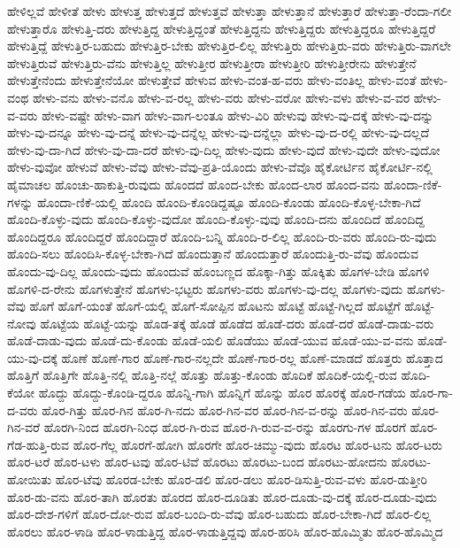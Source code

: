 {ಹೇಳಿಲ್ಲವೆ
ಹೇಳೀತೆ
ಹೇಳು
ಹೇಳುತ್ತ
ಹೇಳುತ್ತದೆ
ಹೇಳುತ್ತವೆ
ಹೇಳುತ್ತಾ
ಹೇಳುತ್ತಾನೆ
ಹೇಳುತ್ತಾರೆ
ಹೇಳುತ್ತಾ-ರೆಂದಾ-ಗಲೀ
ಹೇಳುತ್ತಾರೊ
ಹೇಳುತ್ತಿ-ದರು
ಹೇಳುತ್ತಿದ್ದ
ಹೇಳುತ್ತಿದ್ದಂತೆ
ಹೇಳುತ್ತಿದ್ದನು
ಹೇಳುತ್ತಿದ್ದರು
ಹೇಳುತ್ತಿದ್ದರೂ
ಹೇಳುತ್ತಿದ್ದರೆ
ಹೇಳುತ್ತಿದ್ದೆ
ಹೇಳುತ್ತಿರ-ಬಹುದು
ಹೇಳುತ್ತಿರ-ಬೇಕು
ಹೇಳುತ್ತಿರ-ಲಿಲ್ಲ
ಹೇಳುತ್ತಿರು
ಹೇಳುತ್ತಿರು-ವರು
ಹೇಳುತ್ತಿರು-ವಾಗಲೇ
ಹೇಳುತ್ತಿರುವೆ
ಹೇಳುತ್ತಿರು-ವೆನು
ಹೇಳುತ್ತಿಲ್ಲ
ಹೇಳುತ್ತೀರ
ಹೇಳುತ್ತೀರಾ
ಹೇಳುತ್ತೀರಿ
ಹೇಳುತ್ತೀರೇನು
ಹೇಳುತ್ತೇನೆ
ಹೇಳುತ್ತೇನೆಂದು
ಹೇಳುತ್ತೇನೆಯೋ
ಹೇಳುತ್ತೇವೆ
ಹೇಳುವ
ಹೇಳು-ವಂತ-ಹ-ವರು
ಹೇಳು-ವಂತಿಲ್ಲ
ಹೇಳು-ವಂತೆ
ಹೇಳು-ವಂಥ
ಹೇಳು-ವನು
ಹೇಳು-ವನೊ
ಹೇಳು-ವ-ರಲ್ಲ
ಹೇಳು-ವರು
ಹೇಳು-ವರೋ
ಹೇಳು-ವಳು
ಹೇಳು-ವ-ವರ
ಹೇಳು-ವ-ವರು
ಹೇಳು-ವಷ್ಟೇ
ಹೇಳು-ವಾಗ
ಹೇಳು-ವಾಗ-ಲಂತೂ
ಹೇಳು-ವಿರಿ
ಹೇಳುವು
ಹೇಳು-ವು-ದಕ್ಕೆ
ಹೇಳು-ವು-ದನ್ನು
ಹೇಳು-ವು-ದನ್ನೂ
ಹೇಳು-ವು-ದನ್ನೆ
ಹೇಳು-ವು-ದನ್ನೆಲ್ಲ
ಹೇಳು-ವು-ದನ್ನೆಲ್ಲಾ
ಹೇಳು-ವು-ದ-ರಲ್ಲಿ
ಹೇಳು-ವು-ದಲ್ಲದೆ
ಹೇಳು-ವು-ದಾ-ಗಿದೆ
ಹೇಳು-ವು-ದಾ-ದರೆ
ಹೇಳು-ವು-ದಿಲ್ಲ
ಹೇಳು-ವುದು
ಹೇಳು-ವುದೆ
ಹೇಳು-ವುದೇ
ಹೇಳು-ವುದೋ
ಹೇಳು-ವುವೋ
ಹೇಳುವೆ
ಹೇಳು-ವೆವು
ಹೇಳು-ವೆವು-ಪ್ರತಿ-ಯೊಂದು
ಹೇಳು-ವೆವೊ
ಹೈಕೋರ್ಟಿನ
ಹೈಕೋರ್ಟಿ-ನಲ್ಲಿ
ಹೈಮಾಚಲ
ಹೊಂಚು-ಹಾಕುತ್ತಿ-ರುವುದು
ಹೊಂದದೆ
ಹೊಂದ-ಬೇಕು
ಹೊಂದ-ಲಾರ
ಹೊಂದ-ವನು
ಹೊಂದಾ-ಣಿಕೆ-ಗಳನ್ನು
ಹೊಂದಾ-ಣಿಕೆ-ಯಲ್ಲಿ
ಹೊಂದಿ
ಹೊಂದಿ-ಕೊಂಡಿದ್ದಷ್ಟೂ
ಹೊಂದಿ-ಕೊಂಡು
ಹೊಂದಿ-ಕೊಳ್ಳ-ಬೇಕಾ-ಗಿದೆ
ಹೊಂದಿ-ಕೊಳ್ಳು-ವುದು
ಹೊಂದಿ-ಕೊಳ್ಳು-ವುದೋ
ಹೊಂದಿ-ಕೊಳ್ಳು-ವುವು
ಹೊಂದಿ-ದನು
ಹೊಂದಿದೆ
ಹೊಂದಿದ್ದ
ಹೊಂದಿದ್ದರೂ
ಹೊಂದಿದ್ದರೆ
ಹೊಂದಿದ್ದಾರೆ
ಹೊಂದಿ-ಬನ್ನಿ
ಹೊಂದಿ-ರ-ಲಿಲ್ಲ
ಹೊಂದಿ-ರು-ವರು
ಹೊಂದಿ-ರು-ವುದು
ಹೊಂದಿ-ಸಲು
ಹೊಂದಿಸಿ-ಕೊಳ್ಳ-ಬೇಕಾ-ಗಿದೆ
ಹೊಂದುತ್ತಾನೆ
ಹೊಂದುತ್ತಾರೆ
ಹೊಂದುತ್ತಿ-ರು-ವೆವು
ಹೊಂದುವ
ಹೊಂದು-ವು-ದಿಲ್ಲ
ಹೊಂದು-ವುದು
ಹೊಂದುವೆ
ಹೊಂಬಣ್ಣದ
ಹೊಕ್ಕಾ-ಗಿತ್ತು
ಹೊಕ್ಕಿತು
ಹೊಗಳ-ಬೇಡಿ
ಹೊಗಳಿ
ಹೊಗಳಿ-ದ-ರೇನು
ಹೊಗಳುತ್ತೇನೆ
ಹೊಗಳು-ಭಟ್ಟರು
ಹೊಗಳು-ವರು
ಹೊಗಳು-ವು-ದಲ್ಲ
ಹೊಗಳು-ವುದು
ಹೊಗಳು-ವೆವು
ಹೊಗೆ
ಹೊಗೆ-ಯಂತೆ
ಹೊಗೆ-ಯಲ್ಲಿ
ಹೊಗೆ-ಸೋಪ್ಪಿನ
ಹೊಟನು
ಹೊಟ್ಟೆ
ಹೊಟ್ಟೆ-ಗಿಲ್ಲದೆ
ಹೊಟ್ಟೆಗೆ
ಹೊಟ್ಟೆ-ನೋವು
ಹೊಟ್ಟೆಯ
ಹೊಟ್ಟೆ-ಯನ್ನು
ಹೊಡ-ತಕ್ಕೆ
ಹೊಡೆ
ಹೊಡೆದ
ಹೊಡೆ-ದರು
ಹೊಡೆ-ದರೆ
ಹೊಡೆ-ದಾಡು-ವರು
ಹೊಡೆ-ದಾಡು-ವುದು
ಹೊಡೆ-ದು-ಕೊಂಡು
ಹೊಡೆ-ಯಲಿ
ಹೊಡೆಯು
ಹೊಡೆ-ಯುವ
ಹೊಡೆ-ಯು-ವ-ವನು
ಹೊಡೆ-ಯು-ವು-ದಕ್ಕೆ
ಹೊಣೆ
ಹೊಣೆ-ಗಾರ
ಹೊಣೆ-ಗಾರ-ನಲ್ಲದೇ
ಹೊಣೆ-ಗಾರ-ರಲ್ಲ
ಹೊಣೆ-ಮಾಡದೆ
ಹೊತ್ತರು
ಹೊತ್ತಾದ
ಹೊತ್ತಿಗೆ
ಹೊತ್ತಿಗೇ
ಹೊತ್ತಿ-ನಲ್ಲಿ
ಹೊತ್ತಿ-ನಲ್ಲೆ
ಹೊತ್ತು
ಹೊತ್ತು-ಕೊಂಡು
ಹೊದಿಕೆ
ಹೊದಿಕೆ-ಯಲ್ಲಿ-ರುವ
ಹೊದಿ-ಕೆಯೋ
ಹೊದ್ದು
ಹೊದ್ದು-ಕೊಂಡಿ-ದ್ದರೂ
ಹೊನ್ನಿ-ಗಾಗಿ
ಹೊನ್ನಿಗೆ
ಹೊನ್ನು
ಹೊರ
ಹೊರಕ್ಕೆ
ಹೊರ-ಗಡೆಯ
ಹೊರ-ಗಾ-ದ-ವರು
ಹೊರ-ಗಿತ್ತು
ಹೊರ-ಗಿನ
ಹೊರ-ಗಿ-ನದು
ಹೊರ-ಗಿನ-ವರ
ಹೊರ-ಗಿನ-ವ-ರನ್ನು
ಹೊರ-ಗಿನ-ವರು
ಹೊರ-ಗಿನ-ವರೆ
ಹೊರಗಿ-ನಿಂದ
ಹೊರಗಿ-ನಿಂಧ
ಹೊರ-ಗಿ-ರುವ
ಹೊರ-ಗಿ-ರುವ-ವ-ರನ್ನು
ಹೊರಗು-ಗಳ
ಹೊರಗೆ
ಹೊರ-ಗೆಡ-ಹುತ್ತಿ-ರುವ
ಹೊರ-ಗೆಲ್ಲ
ಹೊರಗೆ-ಹೋಗಿ
ಹೊರಗೇ
ಹೊರ-ಚಿಮ್ಮು-ವುದು
ಹೊರಟ
ಹೊರ-ಟನು
ಹೊರ-ಟರು
ಹೊರ-ಟರೆ
ಹೊರ-ಟಳು
ಹೊರ-ಟವು
ಹೊರ-ಟಿವೆ
ಹೊರಟು
ಹೊರಟು-ಬಂದ
ಹೊರಟು-ಹೋದನು
ಹೊರಟು-ಹೋಯಿತು
ಹೊರ-ಟೆವು
ಹೊರಡ-ಬೇಕು
ಹೊರ-ಡಲಿ
ಹೊರ-ಡಲು
ಹೊರ-ಡಿಸುತ್ತಿ-ರುವ-ವಳು
ಹೊರ-ಡುತ್ತೀರಿ
ಹೊರ-ಡು-ವನು
ಹೊರ-ತಾಗಿ
ಹೊರತು
ಹೊರದ
ಹೊರ-ದೂಡಿತು
ಹೊರ-ದೂಡು-ವು-ದಕ್ಕೆ
ಹೊರ-ದೂಡು-ವುದು
ಹೊರ-ದೇಶ-ಗಳಿಗೆ
ಹೊರ-ದೋ-ರುವ
ಹೊರ-ಬಂದಿ-ರು-ವೆವು
ಹೊರ-ಬಹುದು
ಹೊರ-ಬೇಕಾ-ಗಿದೆ
ಹೊರ-ಲಿಲ್ಲ
ಹೊರಲು
ಹೊರ-ಳಾಡಿ
ಹೊರ-ಳಾಡುತ್ತಿದ್ದ
ಹೊರ-ಳಾಡುತ್ತಿದ್ದವು
ಹೊರ-ಹರಿಸಿ
ಹೊರ-ಹೊಮ್ಮಿತು
ಹೊರ-ಹೊಮ್ಮಿದ
}
